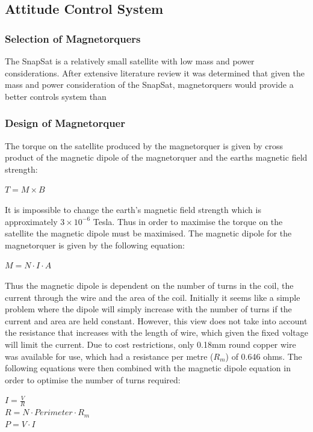 \subsection{Attitude Control System}
\subsubsection{Selection of Magnetorquers}
The SnapSat is a relatively small satellite with low mass and power considerations.
After extensive literature review it was determined that given the mass and power consideration of the SnapSat, magnetorquers would provide a better controls system than 

\subsubsection{Design of Magnetorquer}
The torque on the satellite produced by the magnetorquer is given by cross product of the magnetic dipole of the magnetorquer and the earths magnetic field strength: 
\begin{center}
$T = M \times B$
\end{center}
It is impossible to change the earth's magnetic field strength which is approximately $3 \times 10^{-6}$ Tesla.  Thus in order to maximise the torque on the satellite the magnetic dipole must be maximised. The magnetic dipole for the magnetorquer is given by the following equation:
\begin{center}
$M = N \cdot I \cdot A$
\end{center}
Thus the magnetic dipole is dependent on the number of turns in the coil, the current through the wire and the area of the coil.  Initially it seems like a simple problem where the dipole will simply increase with the number of turns if the current and area are held constant.  However, this view does not take into account the resistance that increases with the length of wire, which given the fixed voltage will limit the current.  Due to cost restrictions, only 0.18mm round copper wire was available for use, which had a resistance per metre ($R_m$) of 0.646 ohms.  The following equations were then combined with the magnetic dipole equation in order to optimise the number of turns required:
\begin{center}
$I = \frac{V}{R}$\vspace{2mm}\\
$R = N \cdot Perimeter \cdot R_m$ \vspace{2mm}\\
$P = V \cdot I$
\end{center}
